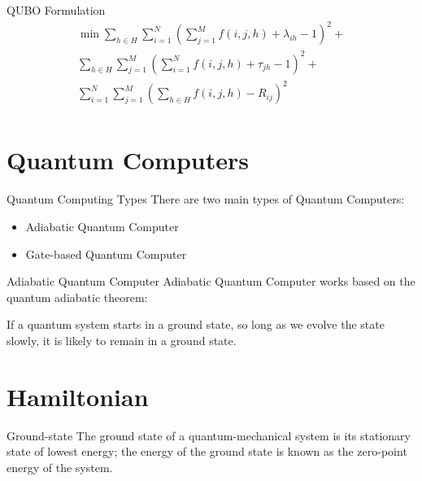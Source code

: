 \documentclass[14pt, aspectratio=169]{beamer}
\begin{document}
\begin{frame}{QUBO Formulation}
    \centering
    \begin{equation}
        \begin{split}
            \min\sum\limits_{h \in H} \sum\limits_{i=1}^{N} \left(\sum\limits_{j=1}^{M} f(i,j,h)+\lambda_{ih}-1\right)^2 + \\
            \sum\limits_{h \in H} \sum\limits_{j=1}^{M} \left(\sum\limits_{i=1}^{N} f(i,j,h)+\tau_{jh}-1\right)^2 + \\
            \sum_{i=1}^{N} \sum_{j=1}^{M} \left(\sum_{h\in H} f(i,j,h) - R_{ij}\right)^2 \\
        \end{split}
    \end{equation}
\end{frame}

\section{Quantum Computers}
\begin{frame}{Quantum Computing Types}
    There are two main types of Quantum Computers:\\
    \begin{itemize}
        \item Adiabatic Quantum Computer
        \item Gate-based Quantum Computer
    \end{itemize}
\end{frame}

\begin{frame}{Adiabatic Quantum Computer}
    Adiabatic Quantum Computer works based on the quantum adiabatic theorem:
    \begin{theorem}
        If a quantum system starts in a ground state, so long as we evolve the state slowly, it is likely to remain in a ground state.
    \end{theorem}
\end{frame}

\section{Hamiltonian}
\begin{frame}{Ground-state}
    The ground state of a quantum-mechanical system is its stationary state of lowest energy; the energy of the ground state is known as the zero-point energy of the system.
\end{frame}
\end{document}
